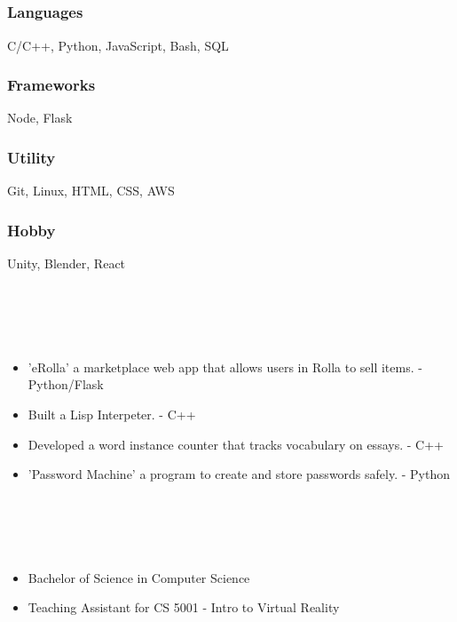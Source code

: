 \documentclass{article}
\begin{document}
\section{\\}
\subsubsection{Languages}
C/C++, Python, JavaScript, Bash, SQL 
\subsubsection{Frameworks}
Node, Flask
\subsubsection{Utility}
Git, Linux, HTML, CSS, AWS
\subsubsection{Hobby}
Unity, Blender, React
\section{\\}
\begin{itemize}
\item 'eRolla' a marketplace web app that allows users in Rolla to sell items. - Python/Flask 
\item Built a Lisp Interpeter. -  C++
\item Developed a word instance counter that tracks vocabulary on essays. - C++ 
\item 'Password Machine' a program to create and store passwords safely. - Python 
\end{itemize}
\section{\\}
\begin{itemize}
\subsection*{Missouri University of Science and Technology\hfill\mdseries Graduated May 2021}
\item Bachelor of Science in Computer Science
\item Teaching Assistant for CS 5001 - Intro to Virtual Reality
\end{itemize}
\end{document}
